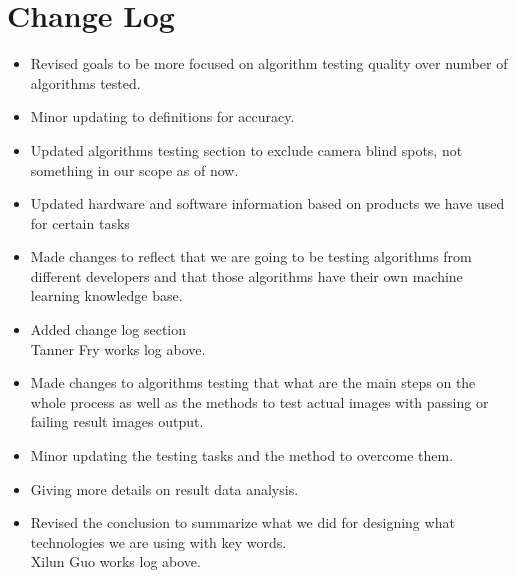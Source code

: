 \documentclass[10pt,draftclsnofoot,onecolumn,journal,compsoc]{IEEEtran}
\begin{document}
\section{Change Log}
\begin{itemize}
	\item Revised goals to be more focused on algorithm testing quality over number of algorithms tested.
	\item Minor updating to definitions for accuracy.
	\item Updated algorithms testing section to exclude camera blind spots, not something in our scope as of now.
	\item Updated hardware and software information based on products we have used for certain tasks
	\item Made changes to reflect that we are going to be testing algorithms from different developers and that those algorithms have their own machine learning knowledge base.
	\item Added change log section\\

Tanner Fry works log above.\\
    
    \item Made changes to algorithms testing that what are the main steps on the whole process as well as the methods to test actual images with passing or failing result images output.
    \item Minor updating the testing tasks and the method to overcome them.
    \item Giving more details on result data analysis.
    \item Revised the conclusion to summarize what we did for designing what technologies we are using with key words.\\
     
Xilun Guo works log above.\\

\end{itemize}

\newpage
\newcommand{\firstdayoffallterm}{2016-09-21}      %
\newcommand{\startday}{2016-10-02}                %
\newcommand{\fallprogressreportdue}{2016-12-05}   %
\newcommand{\alphareleasedue}{2017-02-13}         %
\newcommand{\betareleasedue}{2017-03-20}          %
\newcommand{\winterprogressreportdue}{2017-03-20} %
\newcommand{\releasedue}{2017-05-15}              %
\newcommand{\expoday}{2017-05-19}                 %
\newcommand{\finalreportdue}{2017-06-12}          %
\newcommand{\lastdayofspringterm}{2017-06-16}     %
\end{document}
